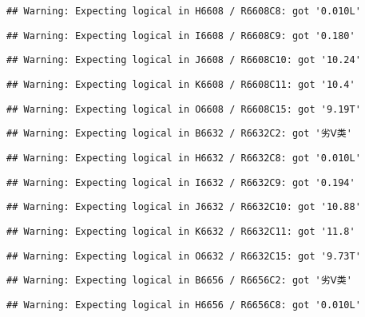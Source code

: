 \documentclass[
]{article}
\begin{document}
\begin{verbatim}
## Warning: Expecting logical in H6608 / R6608C8: got '0.010L'
\end{verbatim}

\begin{verbatim}
## Warning: Expecting logical in I6608 / R6608C9: got '0.180'
\end{verbatim}

\begin{verbatim}
## Warning: Expecting logical in J6608 / R6608C10: got '10.24'
\end{verbatim}

\begin{verbatim}
## Warning: Expecting logical in K6608 / R6608C11: got '10.4'
\end{verbatim}

\begin{verbatim}
## Warning: Expecting logical in O6608 / R6608C15: got '9.19T'
\end{verbatim}

\begin{verbatim}
## Warning: Expecting logical in B6632 / R6632C2: got '劣Ⅴ类'
\end{verbatim}

\begin{verbatim}
## Warning: Expecting logical in H6632 / R6632C8: got '0.010L'
\end{verbatim}

\begin{verbatim}
## Warning: Expecting logical in I6632 / R6632C9: got '0.194'
\end{verbatim}

\begin{verbatim}
## Warning: Expecting logical in J6632 / R6632C10: got '10.88'
\end{verbatim}

\begin{verbatim}
## Warning: Expecting logical in K6632 / R6632C11: got '11.8'
\end{verbatim}

\begin{verbatim}
## Warning: Expecting logical in O6632 / R6632C15: got '9.73T'
\end{verbatim}

\begin{verbatim}
## Warning: Expecting logical in B6656 / R6656C2: got '劣Ⅴ类'
\end{verbatim}

\begin{verbatim}
## Warning: Expecting logical in H6656 / R6656C8: got '0.010L'
\end{verbatim}
\end{document}
